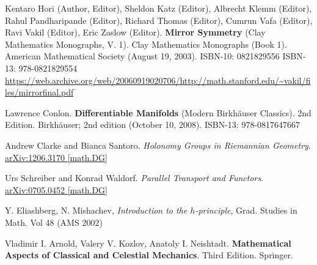 \documentclass[10pt]{amsart}
\begin{document}
\begin{thebibliography}{9}
Kentaro Hori (Author, Editor), Sheldon Katz (Editor), Albrecht Klemm (Editor), Rahul Pandharipande (Editor), Richard Thomas (Editor), Cumrun Vafa (Editor), Ravi Vakil (Editor), Eric Zaslow (Editor).  \textbf{Mirror Symmetry} (Clay Mathematics Monographs, V. 1).  Clay Mathematics Monographs (Book 1).  American Mathematical Society (August 19, 2003).  ISBN-10: 0821829556  ISBN-13: 978-0821829554  \url{https://web.archive.org/web/20060919020706/http://math.stanford.edu/~vakil/files/mirrorfinal.pdf}

Lawrence Conlon.  \textbf{Differentiable Manifolds} (Modern Birkhäuser Classics).  2nd Edition.  Birkhäuser; 2nd edition (October 10, 2008).  ISBN-13: 978-0817647667




Andrew Clarke and Bianca Santoro.  \emph{Holonomy Groups in Riemannian Geometry}.  \href{https://arxiv.org/pdf/1206.3170.pdf}{arXiv:1206.3170 [math.DG]}

Urs Schreiber and Konrad Waldorf.  \emph{Parallel Transport and Functors}.  \href{https://arxiv.org/pdf/0705.0452.pdf}{arXiv:0705.0452 [math.DG]}

Y. Eliashberg, N. Mishachev, \emph{Introduction to the $h$-principle}, Grad. Studies in Math. Vol 48 (AMS 2002)


Vladimir I. Arnold, Valery V. Kozlov, Anatoly I. Neishtadt.  \textbf{Mathematical Aspects of Classical and Celestial Mechanics}.  Third Edition.  Springer.  


\end{thebibliography}
\end{document}
